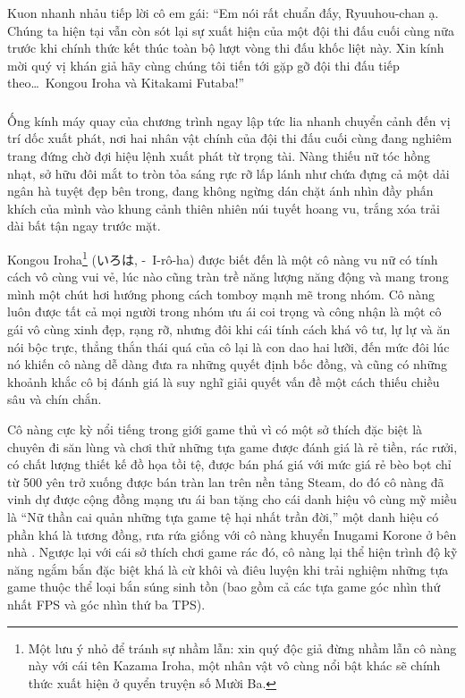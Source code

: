 \documentclass[../main.tex]{subfiles}
\begin{document}
Kuon nhanh nhảu tiếp lời cô em gái: ``Em nói rất chuẩn đấy, Ryuuhou-chan ạ. Chúng ta hiện tại vẫn còn sót lại sự xuất hiện của một đội thi đấu cuối cùng nữa trước khi chính thức kết thúc toàn bộ lượt vòng thi đấu khốc liệt này. Xin kính mời quý vị khán giả hãy cùng chúng tôi tiến tới gặp gỡ đội thi đấu tiếp theo\dots\ Kongou Iroha và Kitakami Futaba!''

\subsubsection*{\label{ep-003.I}}

Ống kính máy quay của chương trình ngay lập tức lia nhanh chuyển cảnh đến vị trí dốc xuất phát, nơi hai nhân vật chính của đội thi đấu cuối cùng đang nghiêm trang đứng chờ đợi hiệu lệnh xuất phát từ trọng tài. Nàng thiếu nữ tóc hồng nhạt, sở hữu đôi mắt to tròn tỏa sáng rực rỡ lấp lánh như chứa đựng cả một dải ngân hà tuyệt đẹp bên trong, đang không ngừng dán chặt ánh nhìn đầy phấn khích của mình vào khung cảnh thiên nhiên núi tuyết hoang vu, trắng xóa trải dài bất tận ngay trước mặt.

\chrint

Kongou Iroha\footnote{Một lưu ý nhỏ để tránh sự nhầm lẫn: xin quý độc giả đừng nhầm lẫn cô nàng này với cái tên Kazama Iroha, một nhân vật vô cùng nổi bật khác sẽ chính thức xuất hiện ở quyển truyện số Mười Ba.} (いろは, -\ I-rô-ha) được biết đến là một cô nàng vu nữ có tính cách vô cùng vui vẻ, lúc nào cũng tràn trề năng lượng năng động và mang trong mình một chút hơi hướng phong cách tomboy mạnh mẽ trong nhóm. Cô nàng luôn được tất cả mọi người trong nhóm ưu ái coi trọng và công nhận là một cô gái vô cùng xinh đẹp, rạng rỡ, nhưng đôi khi cái tính cách khá vô tư, lự lự và ăn nói bộc trực, thẳng thắn thái quá của cô lại là con dao hai lưỡi, đến mức đôi lúc nó khiến cô nàng dễ dàng đưa ra những quyết định bốc đồng, và cũng có những khoảnh khắc cô bị đánh giá là suy nghĩ giải quyết vấn đề một cách thiếu chiều sâu và chín chắn.


Cô nàng cực kỳ nổi tiếng trong giới game thủ vì có một sở thích đặc biệt là chuyên đi săn lùng và chơi thử những tựa game được đánh giá là rẻ tiền, rác rưởi, có chất lượng thiết kế đồ họa tồi tệ, được bán phá giá với mức giá rẻ bèo bọt chỉ từ 500 yên trở xuống được bán tràn lan trên nền tảng Steam, do đó cô nàng đã vinh dự được cộng đồng mạng ưu ái ban tặng cho cái danh hiệu vô cùng mỹ miều là ``Nữ thần cai quản những tựa game tệ hại nhất trần đời,'' một danh hiệu có phần khá là tương đồng, rưa rứa giống với cô nàng khuyển Inugami Korone ở bên nhà \hll. Ngược lại với cái sở thích chơi game rác đó, cô nàng lại thể hiện trình độ kỹ năng ngắm bắn đặc biệt khá là cừ khôi và điêu luyện khi trải nghiệm những tựa game thuộc thể loại bắn súng sinh tồn (bao gồm cả các tựa game góc nhìn thứ nhất FPS và góc nhìn thứ ba TPS).
\end{document}
